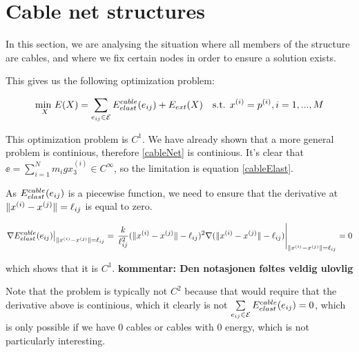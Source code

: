 \section{Cable net structures}
In this section, we are analysing the situation where all members of the structure are cables, and where we fix certain nodes in order to ensure a solution exists.

This gives us the following optimization problem:

\begin{equation}
    \underset{X}{\text{min }} E(X) = \sum\limits_{e_{ij} \in \mathcal{E}} E^{cable}_{elast}(e_{ij}) + E_{ext}(X) \quad \text{s.t. } x^{(i)} = p^{(i)}, i = 1,...,M
    \label{cableNet}
\end{equation}

This optimization problem is $C^1$. We have already shown that a more general problem is continious, therefore \eqref{cableNet} is continious. It's clear that $\ee = \sum_{i=1}^N m_i g x_3^{(i)} \in C^{\infty}$, so the limitation is equation \eqref{cableElast}.

As $E^{cable}_{elast}(e_{ij})$ is a piecewise function, we need to ensure that the derivative at $\lVert x^{(i)} - x^{(j)}\rVert = \ell_{ij}$ is equal to zero.

\begin{equation}
    \left.\nabla E^{cable}_{elast}(e_{ij})\right|_{\lVert x^{(i)} - x^{(j)}\rVert = \ell_{ij}} = \left. \frac{k}{\ell_{ij}^2}(\lVert x^{(i)} - x^{(j)}\rVert - \ell_{ij})^2 \nabla (\lVert x^{(i)} - x^{(j)}\rVert-\ell_{ij}) \right|_{\lVert x^{(i)} - x^{(j)}\rVert = \ell_{ij}} = 0
\end{equation}

which shows that it is $C^1$.
\textbf{kommentar: Den notasjonen føltes veldig ulovlig}

Note that the problem is typically not $C^2$ because that would require that the derivative above is continious, which it clearly is not
$\sum\limits_{e_{ij} \in \mathcal{E}} E^{cable}_{elast}(e_{ij}) = 0$, which is only possible if we have $0$ cables or cables with $0$ energy, which is not particularly interesting.